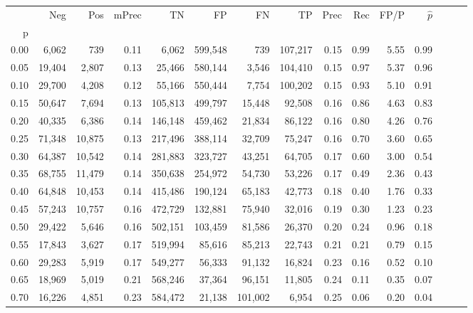 \begin{tabular}{rrrrrrrrrrrrrrr}
\toprule
{} &     Neg &     Pos & mPrec &       TN &       FP &       FN &       TP &  Prec &   Rec &  FP/P & $\hat{p}$ \\
p    &         &         &       &          &          &          &          &       &       &       &           \\
\midrule
0.00 &   6,062 &     739 &  0.11 &    6,062 &  599,548 &      739 &  107,217 &  0.15 &  0.99 &  5.55 &      0.99 \\
0.05 &  19,404 &   2,807 &  0.13 &   25,466 &  580,144 &    3,546 &  104,410 &  0.15 &  0.97 &  5.37 &      0.96 \\
0.10 &  29,700 &   4,208 &  0.12 &   55,166 &  550,444 &    7,754 &  100,202 &  0.15 &  0.93 &  5.10 &      0.91 \\
0.15 &  50,647 &   7,694 &  0.13 &  105,813 &  499,797 &   15,448 &   92,508 &  0.16 &  0.86 &  4.63 &      0.83 \\
0.20 &  40,335 &   6,386 &  0.14 &  146,148 &  459,462 &   21,834 &   86,122 &  0.16 &  0.80 &  4.26 &      0.76 \\
0.25 &  71,348 &  10,875 &  0.13 &  217,496 &  388,114 &   32,709 &   75,247 &  0.16 &  0.70 &  3.60 &      0.65 \\
0.30 &  64,387 &  10,542 &  0.14 &  281,883 &  323,727 &   43,251 &   64,705 &  0.17 &  0.60 &  3.00 &      0.54 \\
0.35 &  68,755 &  11,479 &  0.14 &  350,638 &  254,972 &   54,730 &   53,226 &  0.17 &  0.49 &  2.36 &      0.43 \\
0.40 &  64,848 &  10,453 &  0.14 &  415,486 &  190,124 &   65,183 &   42,773 &  0.18 &  0.40 &  1.76 &      0.33 \\
0.45 &  57,243 &  10,757 &  0.16 &  472,729 &  132,881 &   75,940 &   32,016 &  0.19 &  0.30 &  1.23 &      0.23 \\
0.50 &  29,422 &   5,646 &  0.16 &  502,151 &  103,459 &   81,586 &   26,370 &  0.20 &  0.24 &  0.96 &      0.18 \\
0.55 &  17,843 &   3,627 &  0.17 &  519,994 &   85,616 &   85,213 &   22,743 &  0.21 &  0.21 &  0.79 &      0.15 \\
0.60 &  29,283 &   5,919 &  0.17 &  549,277 &   56,333 &   91,132 &   16,824 &  0.23 &  0.16 &  0.52 &      0.10 \\
0.65 &  18,969 &   5,019 &  0.21 &  568,246 &   37,364 &   96,151 &   11,805 &  0.24 &  0.11 &  0.35 &      0.07 \\
0.70 &  16,226 &   4,851 &  0.23 &  584,472 &   21,138 &  101,002 &    6,954 &  0.25 &  0.06 &  0.20 &      0.04 \\

\end{tabular}
